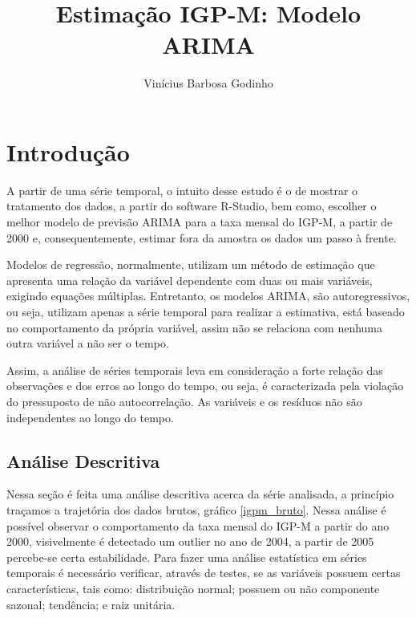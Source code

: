 \documentclass[a4paper,12pt,oneside,titlepage]{article}
\begin{document}
\title{Estimação IGP-M: Modelo ARIMA}
\author{Vinícius Barbosa Godinho}

\maketitle




\section*{Introdução}



A partir de uma série temporal, o intuito desse estudo é o de mostrar o tratamento dos dados, a partir do software R-Studio, bem como, escolher
o melhor modelo de previsão ARIMA para a taxa mensal do IGP-M, a
partir de 2000 e, consequentemente, estimar fora da amostra os dados
um passo à frente.

Modelos de regressão, normalmente, utilizam um método de
estimação que apresenta uma relação da variável dependente com duas
ou mais variáveis, exigindo equações múltiplas. Entretanto, os modelos
ARIMA, são autoregressivos, ou seja, utilizam apenas a série temporal
para realizar a estimativa, está baseado no comportamento da própria
variável, assim não se relaciona com nenhuma outra variável a não ser
o tempo.

Assim, a análise de séries temporais leva em consideração a forte
relação das observações e dos erros ao longo do tempo, ou seja, é
caracterizada pela violação do pressuposto de não autocorrelação. As
variáveis e os resíduos não são independentes ao longo do tempo.

\subsection*{Análise Descritiva}

Nessa seção é feita uma análise descritiva acerca da série
analisada, a princípio traçamos a trajetória dos dados brutos, gráfico \ref{igpm_bruto}.
Nessa análise é possível observar o comportamento da taxa mensal do
IGP-M a partir do ano 2000, visivelmente é detectado um outlier no ano
de 2004, a partir de 2005 percebe-se certa estabilidade. Para fazer uma
análise estatística em séries temporais é necessário verificar, através de testes, se as
variáveis possuem certas características, tais como: distribuição
normal; possuem ou não componente sazonal; tendência; e raiz
unitária.
\end{document}
